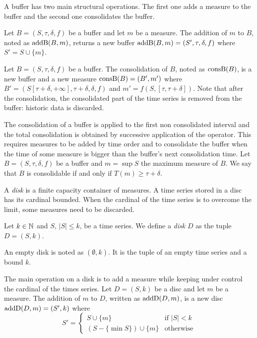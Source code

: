 A buffer has two main structural operations. The first one adds a
measure to the buffer and the second one consolidates the buffer.

Let $B=(S,\tau,\delta,f)$ be a buffer and let $m$ be a measure.  The
addition of $m$ to $B$, noted as $\operatorname{addB}(B,m)$, returns a new buffer
$\operatorname{addB}(B,m)=(S',\tau,\delta,f)$ where $S' = S \cup \{m\}$.

Let $B=(S,\tau,\delta,f)$ be a buffer. The consolidation of $B$, noted
as $\operatorname{consB}(B)$, is a new buffer and a new measure $\operatorname{consB}(B)=(B',m')$
where $ B'= (S[\tau+\delta,+\infty], \tau+\delta,\delta,f)$ and $m' =
f(S,[\tau,\tau+\delta])$. Note that after the consolidation, the
consolidated part of the time series is removed from the buffer:
historic data is discarded.

The consolidation of a buffer is applied to the first non consolidated
interval and the total consolidation is obtained by successive
application of the operator. 
%
This requires measures to be added by time order and to consolidate
the buffer when the time of some measure is bigger than the buffer's
next consolidation time.  
%
Let $B=(S,\tau,\delta,f)$ be a buffer and $m=\sup S$ the maximum
measure of $B$. We say that $B$ is consolidable if and only if $T(m)
\geq \tau+\delta$.
%

A \emph{disk} is a finite capacity container of measures. A time
series stored in a disc has its cardinal bounded. When the cardinal of
the time series is to overcome the limit, some measures need to be
discarded.

\begin{definition}[Disk]
  Let $k\in\mathbb{N}$ and $S$, $|S|\leq k$, be a time series. We define a
  \emph{disk} $D$ as the tuple $D=(S,k)$.
\end{definition}

An empty disk is noted as $(\emptyset,k)$. It is the tuple of an
empty time series and a bound $k$.

The main operation on a disk is to add a measure while keeping under
control the cardinal of the times series. Let $D=(S,k)$ be a disc and
let $m$ be a measure.  The addition of $m$ to $D$, written as
$\operatorname{addD}(D,m)$, is a new disc $\operatorname{addD}(D,m)=(S',k)$ where
%
\[
S' = \begin{cases}
  S\cup\{m\}                 & \text{if } |S|<k  \\
  (S-\{\min S\}) \cup \{m\} & \text{otherwise}
\end{cases}  
\]

